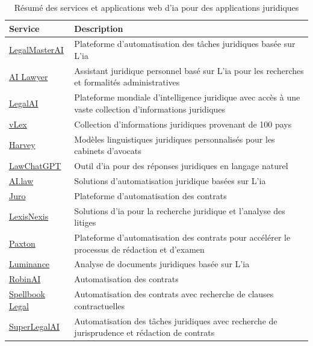 \begin{table}[h]
    \centering
    \begin{tabular}{|l|p{12cm}|}
        \hline
        \textbf{Service} & \textbf{Description} \\
        \hline
        \href{https://legalmasterai.com/}{LegalMasterAI} & Plateforme d'automatisation des tâches juridiques basée sur L'\ac{ia} \\
        \hline
        \href{https://ailawyer.pro/fr}{AI Lawyer} & Assistant juridique personnel basé sur L'\ac{ia} pour les recherches et formalités administratives \\
        \hline
        \href{https://www.legalai.io/}{LegalAI} & Plateforme mondiale d'intelligence juridique avec accès à une vaste collection d'informations juridiques \\
        \hline
        \href{https://vlex.com/}{vLex} & Collection d'informations juridiques provenant de 100 pays \\
        \hline
        \href{https://www.harvey.ai/}{Harvey} & Modèles linguistiques juridiques personnalisés pour les cabinets d'avocats \\
        \hline
        \href{https://lawchatgpt.com/}{LawChatGPT} & Outil d'\ac{ia} pour des réponses juridiques en langage naturel \\
        \hline
        \href{https://www.ai.law/}{AI.law} & Solutions d'automatisation juridique basées sur L'\ac{ia} \\
        \hline
        \href{https://juro.com/ai}{Juro} & Plateforme d'automatisation des contrats \\
        \hline
        \href{https://www.lexisnexis.com/en-us/products/lexis-plus-ai.page}{LexisNexis} & Solutions d'\ac{ia} pour la recherche juridique et l'analyse des litiges \\
        \hline
        \href{https://www.paxton.ai/}{Paxton} & Plateforme d'automatisation des contrats pour accélérer le processus de rédaction et d'examen \\
        \hline
        \href{https://www.luminance.com/}{Luminance} & Analyse de documents juridiques basée sur L'\ac{ia} \\
        \hline
        \href{https://www.robinai.com/}{RobinAI} & Automatisation des contrats \\
        \hline
        \href{https://www.spellbook.legal/}{Spellbook Legal} & Automatisation des contrats avec recherche de clauses contractuelles \\
        \hline
        \href{https://www.superlegal.ai/}{SuperLegalAI} & Automatisation des tâches juridiques avec recherche de jurisprudence et rédaction de contrats \\
        \hline
    \end{tabular}

    \caption{Résumé des services et applications web d'\acf{ia} pour des applications juridiques}
    \label{table:law-ai-tool}
\end{table}



